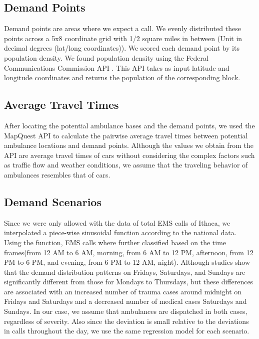 \documentclass{article}
\begin{document}
\subsection{Demand Points}
Demand points are areas where we expect a call. We evenly distributed these points across a 5x8 coordinate grid with 1/2 square miles in between (Unit in decimal degrees (lat/long coordinates)). We scored each demand point by its population density. We found population density using the Federal Communications Commission API \cite{fcc}. This API takes as input latitude and longitude coordinates and returns the population of the corresponding block. 
\subsection{Average Travel Times}
After locating the potential ambulance bases and the demand points, we used
the MapQuest API \cite{mapquest} to calculate the pairwise average travel
times between potential ambulance locations and demand points. Although the values we obtain from the API are average travel times of cars without considering the complex factors such as traffic flow and weather conditions, we assume that the traveling behavior of ambulances resembles that of cars. 
\subsection{Demand Scenarios}
Since we were only allowed with the data of total EMS calls of Ithaca, we interpolated a piece-wise sinusoidal function according to the national data. Using the function, EMS calls where further classified based on the time frames(from 12 AM to 6 AM, morning, from 6 AM to 12 PM, afternoon, from 12 PM to 6 PM, and evening, from 6 PM to 12 AM, night). Although studies show that the demand distribution patterns on Fridays, Saturdays, and Sundays are significantly different from those for Mondays to Thursdays, but these differences are associated with an increased number of trauma cases around midnight on Fridays and Saturdays and a decreased number of medical cases Saturdays and Sundays.\cite{doi:10.3109/10903127.2014.995843} In our case, we assume that ambulances are dispatched in both cases, regardless of severity. Also since the deviation is small relative to the deviations in calls throughout the day, we use the same regression model for each scenario.
\end{document}
